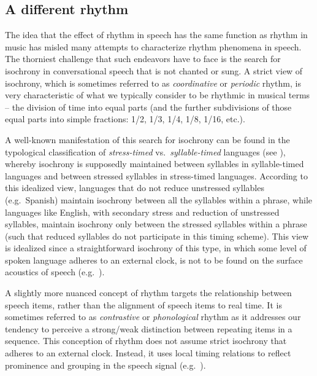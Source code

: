 \subsection{A different rhythm}\label{sec:shiftRhythm}

The idea that the effect of rhythm in speech has the same function as rhythm in music has misled many attempts to characterize rhythm phenomena in speech.
The thorniest challenge that such endeavors have to face is the search for isochrony in conversational speech that is not chanted or sung.
A strict view of isochrony, which is sometimes referred to as \emph{coordinative} or \emph{periodic} rhythm, is very characteristic of what we typically consider to be rhythmic in musical terms -- the division of time into equal parts (and the further subdivisions of those equal parts into simple fractions: 1/2, 1/3, 1/4, 1/8, 1/16, etc.).

A well-known manifestation of this search for isochrony can be found in the typological classification of \emph{stress-timed} vs.~\emph{syllable-timed} languages (see \citealt{pike1945intonationsk, abercrombie1967elements, dauer1983stress, lehiste1990phonetic}), whereby isochrony is supposedly maintained between syllables in syllable-timed languages and between stressed syllables in stress-timed languages. According to this idealized view, languages that do not reduce unstressed syllables (e.g.~Spanish) maintain isochrony between all the syllables within a phrase, while languages like English, with secondary stress and reduction of unstressed syllables, maintain isochrony only between the stressed syllables within a phrase (such that reduced syllables do not participate in this timing scheme).
This view is idealized since a straightforward isochrony of this type, in which some level of spoken language adheres to an external clock, is not to be found on the surface acoustics of speech (e.g.~\citealt{arvaniti2009rhythm, turk2013speechsk}).

A slightly more nuanced concept of rhythm targets the relationship between speech items,
rather than the alignment of speech items to real time.
It is sometimes referred to as \emph{contrastive} or \emph{phonological} rhythm as it addresses our tendency to perceive a strong/weak distinction between repeating items in a sequence. This conception of rhythm does not assume strict isochrony that adheres to an external clock. Instead, it uses local timing relations to reflect prominence and grouping in the speech signal (e.g.~\citealt{arvaniti2009rhythm}).

